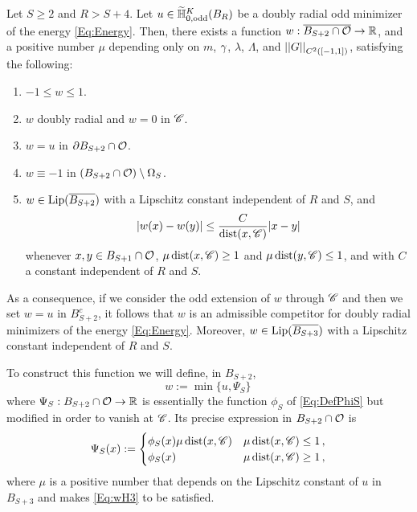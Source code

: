 \begin{lemma}
	\label{Lemma:ExistenceCompetitor}
	Let $S\geq 2$ and $R > S + 4$. Let $u\in \widetilde{\mathbb{H}}^K_{0, \mathrm{odd}}(B_R)$ be a doubly radial odd minimizer of the energy \eqref{Eq:Energy}. Then, there exists  a function $w:\overline{ B_{S+2}\cap \mathcal{O}} \to \mathbb{R}$, and a positive number $\mu$ depending only on $m$, $\gamma$, $\lambda$, $\Lambda$, and $\left | \left |{G} \right | \right |_{C^2([-1,1])}$, satisfying the following:
	
	\begin{enumerate}[label={\normalfont (\textcolor{red}{H\arabic*})}, ref=H\arabic*]
	\item
	\label{Eq:wH1} $-1 \leq w \leq 1$.
	\item
	\label{Eq:wH2} $w$ doubly radial and $w=0$ in $\mathscr{C}$.
	\item
	\label{Eq:wH3} $w=u$ in $\partial B_{S+2} \cap \mathcal{O}$.
	\item
	\label{Eq:wH4} $w\equiv-1$ in $(B_{S+2}\cap \mathcal{O})\setminus \Omega_S$.
	\item
	\label{Eq:wH5} $w\in \mathrm{Lip}(\overline{B_{S+2}})$ with a Lipschitz constant independent of $R$ and $S$, and
	$$ |w(x)-w(y)| \leq \frac{C}{\operatorname{dist}(x,\mathscr{C})}|x-y| $$
	whenever $x,y \in B_{S+1}\cap \mathcal{O}$, $\mu \operatorname{dist}(x,\mathscr{C})\geq 1$ and $\mu \operatorname{dist}(y,\mathscr{C})\leq 1$, and with $C$ a constant independent of $R$ and $S$.
	\end{enumerate} 
	
	As a consequence, if we consider the odd extension of $w$ through $\mathscr{C}$ and then we set $w=u$ in $B_{S+2}^c$, it follows that $w$ is an admissible competitor for doubly radial minimizers of the energy \eqref{Eq:Energy}. Moreover, $w\in \mathrm{Lip}(\overline{B_{S+3}})$ with a Lipschitz constant independent of $R$ and $S$.
\end{lemma}


To construct this function we will define, in $B_{S+2}$,
$$
w:= \min \{u, \Psi_S\}\,
$$
where $\Psi_S:B_{S+2} \cap \mathcal{O} \to \mathbb{R}$ is essentially the function $\phi_S$ of \eqref{Eq:DefPhiS} but modified in order to vanish at $\mathscr{C}$. Its precise expression in $B_{S+2}\cap \mathcal{O}$ is
\begin{equation}
\label{Eq:DefPsiS}
\Psi_S(x) :=
\begin{cases}
\phi_S (x) \mu\operatorname{dist}(x,\mathscr{C}) &  \mu\operatorname{dist}(x,\mathscr{C}) \leq 1 \,, \\
\phi_S (x) &  \mu\operatorname{dist}(x,\mathscr{C}) \geq 1\,,
\end{cases}
\end{equation}
where $\mu$ is a positive number that depends on the Lipschitz constant of $u$ in $B_{S+3}$ and makes \eqref{Eq:wH3} to be satisfied.

